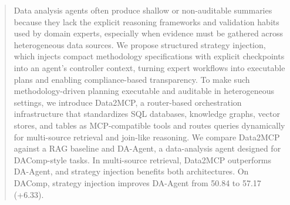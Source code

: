 \begin{abstract}


Data analysis agents often produce shallow or non-auditable summaries because they lack the explicit reasoning frameworks and validation habits used by domain experts, especially when evidence must be gathered across heterogeneous data sources.
We propose structured strategy injection, which injects compact methodology specifications with explicit checkpoints into an agent’s controller context, turning expert workflows into executable plans and enabling compliance-based transparency.
To make such methodology-driven planning executable and auditable in heterogeneous settings, we introduce Data2MCP, a router-based orchestration infrastructure that standardizes SQL databases, knowledge graphs, vector stores, and tables as MCP-compatible tools and routes queries dynamically for multi-source retrieval and join-like reasoning.
We compare Data2MCP against a RAG baseline and DA-Agent, a data-analysis agent designed for DAComp-style tasks. In multi-source retrieval, Data2MCP outperforms DA-Agent, and strategy injection benefits both architectures. On DAComp, strategy injection improves DA-Agent from 50.84 to 57.17 (+6.33).


\end{abstract}
